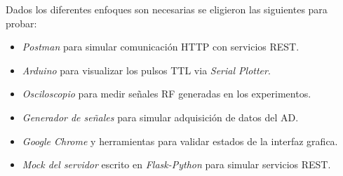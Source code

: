 Dados los diferentes enfoques son necesarias se eligieron las siguientes para probar:
\begin{itemize}
    \item \textit{Postman} para simular comunicaci\'on HTTP con servicios REST.
    \item \textit{Arduino} para visualizar los pulsos TTL via \textit{Serial Plotter}.
    \item \textit{Osciloscopio} para medir se\~nales RF generadas en los experimentos.
    \item \textit{Generador de se\~nales} para simular adquisici\'on de datos del AD.
    \item \textit{Google Chrome} y herramientas para validar estados de la interfaz grafica.
    \item \textit{Mock del servidor} escrito en \textit{Flask-Python} para simular servicios REST.
\end{itemize}
\newpage